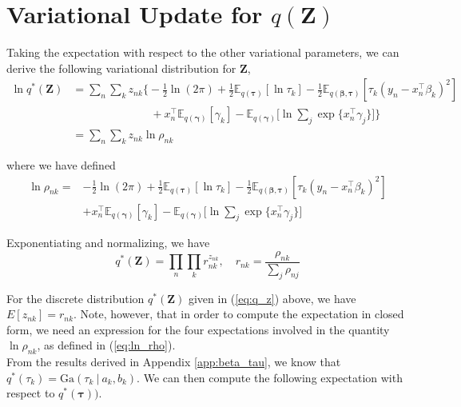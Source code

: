 \documentclass[twoside,11pt]{article}
\newcommand{\tr}{\intercal}
\newcommand\given[1][]{\:#1\vert\:}
\newcommand{\E}{\mathbb{E}}
\begin{document}
\newpage

\appendix
\section{Variational Update for $q(\mathbf{Z})$} 
\label{app:q_z}

Taking the expectation with respect to the other variational parameters, we can derive the following variational distribution for $\mathbf{Z}$,
\begin{align*}
	\ln q^{*}(\mathbf{Z}) &= \sum_n \sum_k z_{nk} \Bigg\{  -\frac{1}{2}\ln(2\pi) + \frac{1}{2} \E_{q(\boldsymbol\tau)}[ \ln \tau_k ] - \frac{1}{2} \E_{q(\boldsymbol\beta, \boldsymbol\tau)}[\tau_k (y_n - x_n^{\tr}\beta_k)^2] \\ 
	&\qquad \qquad \qquad \quad + x_n^{\tr}\E_{q(\boldsymbol\gamma)}[\gamma_k] - \E_{q(\boldsymbol\gamma)}\Bigg[\ln \sum_{j} \exp \{ x_n^{\tr} \gamma_j \}\Bigg]\Bigg\} \\
	&= \sum_n \sum_k z_{nk} \ln \rho_{nk}
\end{align*}

where we have defined 
\begin{equation} \label{eq:ln_rho}
\begin{split}
 \ln \rho_{nk} = &-\frac{1}{2}\ln(2\pi) + \frac{1}{2} \E_{q(\boldsymbol\tau)}[ \ln \tau_k ] - \frac{1}{2} \E_{q(\boldsymbol\beta, \boldsymbol\tau)}[\tau_k (y_n - x_n^{\tr}\beta_k)^2] \\ 
	& + x_n^{\tr}\E_{q(\boldsymbol\gamma)}[\gamma_k] - \E_{q(\boldsymbol\gamma)}\Bigg[\ln \sum_{j} \exp \{ x_n^{\tr} \gamma_j \} \Bigg]
\end{split}
\end{equation}


Exponentiating and normalizing, we have
\begin{equation} \label{eq:q_z}
	q^{*}(\mathbf{Z}) = \prod_{n} \prod_{k} r_{nk}^{z_{nk}}, \quad r_{nk} = \frac{\rho_{nk}}{\sum_{j} \rho_{nj}}
\end{equation}

For the discrete distribution $q^{*}(\mathbf{Z})$ given in (\ref{eq:q_z}) above, we have $E[z_{nk}] = r_{nk}$. Note, however, that in order to compute the expectation in closed form, we need an expression for the four expectations involved in the quantity $\ln \rho_{nk}$, as defined in (\ref{eq:ln_rho}). \\

From the results derived in Appendix \ref{app:beta_tau}, we know that $q^{*}(\tau_k) = \mathrm{Ga}(\tau_k \given a_k, b_k)$. We can then compute the following expectation with respect to $q^{*}(\boldsymbol\tau))$.
\end{document}
